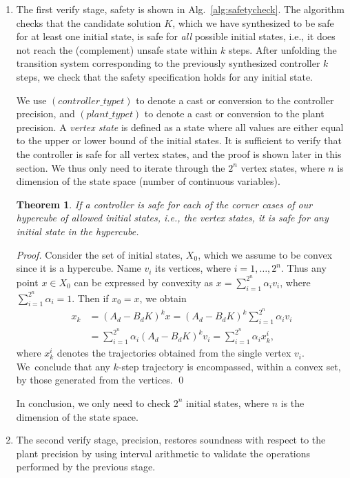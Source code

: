 \documentclass[twocolumn]{autart}    %
\newtheorem{theorem}{Theorem}
\newtheorem{proof}{Proof}
\begin{document}
\begin{enumerate}
\item The first {\sc verify} stage, {\sc safety} is shown in Alg.~\ref{alg:safetycheck}. 
The algorithm checks that the candidate
solution $K$, which we have synthesized to be safe for at least one initial
state, is safe for \emph{all} possible initial states, i.e., it does not reach
the (complement) unsafe state within $k$ steps.  After unfolding the transition system corresponding
to the previously synthesized controller $k$ steps, we check that the safety
specification holds for any initial state. 

We use $(controller\_typet)$ to denote a
cast or conversion to the controller precision, and $(plant\_typet)$ to denote a cast or conversion to the 
plant precision. A \emph{vertex state} is defined as a state where all values are either equal to the upper or lower
bound of the initial states. It is sufficient to verify that the controller is safe for all vertex
states, and the proof is shown later in this section. We thus only need to iterate through the $2^{n}$ vertex
states, where $n$ is dimension of the state space (number of continuous variables).


\begin{theorem} 
If a controller is safe for each of the corner cases of our hypercube of
allowed initial states, i.e., the vertex states, it is safe for any initial state in the hypercube. 
\end{theorem}
\begin{proof}
Consider the set of initial states, $X_0$, which we assume to be convex since it is a hypercube. 
Name $v_i$ its vertices, where $i=1,\ldots, 2^n$.  
Thus any point $x \in X_0$ can be expressed by convexity as $x = \sum_{i=1}^{2^n} \alpha_i v_i$, 
where $\sum_{i=1}^{2^n} \alpha_i =1$. Then if $x_0=x$, we obtain 
\begin{align*}
x_k   &= (A_d - B_d K)^k x = (A_d - B_d K)^k \sum_{i=1}^{2^n} \alpha_i v_i \\
      &= \sum_{i=1}^{2^n} \alpha_i (A_d - B_d K)^k v_i = \sum_{i=1}^{2^n} \alpha_i x_k^i, 
 \end{align*}     
%
where $x_k^i$ denotes the trajectories obtained from the single vertex
$v_i$.  We~conclude that any $k$-step trajectory is encompassed, within a
convex set, by those generated from the vertices. 
\qed
\end{proof}
In conclusion, we only need to check $2^n$ initial states, 
where $n$ is the dimension of the state space. 


\item The second {\sc verify} stage, {\sc precision}, 
 restores soundness with respect to the plant precision
by using interval arithmetic \cite{moore1966interval} to validate the 
operations performed by the previous stage. 


\end{enumerate}
\end{document}
